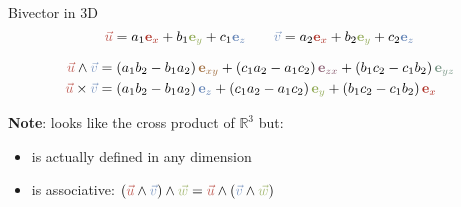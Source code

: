 \begin{frame}{Bivector in 3D}
    \Large
    \[
        \textcolor{u}{\vec{u}} = a_1 \textcolor{red}{\mathbf{e}_x} + b_1 \textcolor{green}{\mathbf{e}_y} + c_1 \textcolor{blue}{\mathbf{e}_z}
        \quad\quad
        \textcolor{v}{\vec{v}} = a_2 \textcolor{red}{\mathbf{e}_x} + b_2 \textcolor{green}{\mathbf{e}_y} + c_2 \textcolor{blue}{\mathbf{e}_z}
    \]

    \vspace{0.5em}

    \begin{align*}
        \textcolor{u}{\vec{u}} \wedge \textcolor{v}{\vec{v}} & =
        (a_1 b_2 - b_1 a_2)\, \textcolor{midredgreen}{\mathbf{e}_{xy}}
        + (c_1 a_2 - a_1 c_2)\, \textcolor{midredblue}{\mathbf{e}_{zx}}
        + (b_1 c_2 - c_1 b_2)\, \textcolor{midgreenblue}{\mathbf{e}_{yz}}
        \\
        \textcolor{u}{\vec{u}} \times \textcolor{v}{\vec{v}} & =
        (a_1 b_2 - b_1 a_2)\, \textcolor{blue}{\mathbf{e}_z}
        + (c_1 a_2 - a_1 c_2)\, \textcolor{green}{\mathbf{e}_y}
        + (b_1 c_2 - c_1 b_2)\, \textcolor{red}{\mathbf{e}_x}
    \end{align*}

    \vspace{0.5em}

    \textbf{Note}: looks like the cross product of \(\mathbb{R}^3\) but:
    \begin{itemize}
        \item is actually defined in any dimension
        \item is associative: \((\textcolor{u}{\vec{u}} \wedge \textcolor{v}{\vec{v}}) \wedge \textcolor{w}{\vec{w}} = \textcolor{u}{\vec{u}} \wedge (\textcolor{v}{\vec{v}} \wedge \textcolor{w}{\vec{w}})\)
    \end{itemize}
\end{frame}

